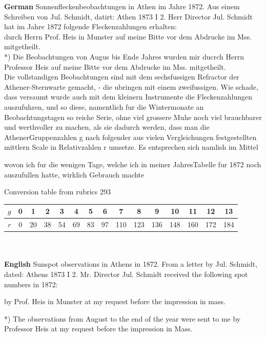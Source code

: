 \documentclass[12pt]{article}
\begin{document}
\textbf{German}
Sonnenfleckenbeobachtungen in Athen im Jahre 1872. Aus einem Schreiben von Jul. Schmidt, datirt: Athen 1873 I 2.
Herr Director Jul. Schmidt hat im Jahre 1872 folgende Fleckenzahlungen erhalten:\\

durch Herrn Prof. Heis in Munster auf meine Bitte vor dem Abdrucke im Mss. mitgetheilt.\\

*) Die Beobachtungen von Augus bis Ende Jahres wurden mir ducrch Herrn Professor Heis auf meine Bitte vor dem Abdrucke im Mss. mitgetheilt. \\

Die vollstandigen Beobachtungen sind mit dem sechsfussigen Refractor der Athener-Sternwarte gemacht, - die ubringen mit einem zweifussigen. Wie schade, dass versaumt wurde auch mit dem kleinern Instrumente die Fleckenzahlungen auszufuhren, und so diese, namentlich fur die Wintermonate an Beobachtungstagen so reiche Serie, ohne viel grossere Muhe noch viel brauchbarer und werthvoller zu machen, als sie dadurch werden, dass man die AthenerGruppenzahlen g nach folgender aus vielen Vergleichungen festgestellten mittlern Scale in Relativzahlen r umsetze. Es entsprechen sich namlish im Mittel

wovon ich fur die wenigen Tage, welche ich in meiner JahresTabelle fur 1872 noch auszufullen hatte, wirklich Gebrauch machte\\

{\centering
    \caption{Conversion table from rubrics 293}
    \begin{tabular}{c|c c c c c c c c c c c c c c }
        $g$ & 0 & 1 & 2 & 3 & 4 & 5 & 6 & 7 & 8 & 9 & 10 & 11 & 12 & 13 \\
        \hline
        $r$ & 0 & 20 & 38 & 54 & 69 & 83 & 97 & 110 & 123 & 136 & 148 & 160 & 172 & 184
    \end{tabular}
    
    \label{table:silly table version 2}
\par}\\

\\ 

\textbf{English}
Sunspot observations in Athens in 1872. From a letter by Jul. Schmidt, dated: Athens 1873 I 2.
Mr. Director Jul. Schmidt received the following spot numbers in 1872:

by Prof. Heis in Munster at my request before the impression in mass.

*) The observations from August to the end of the year were sent to me by Professor Heis at my request before the impression in Mass. 
\end{document}
